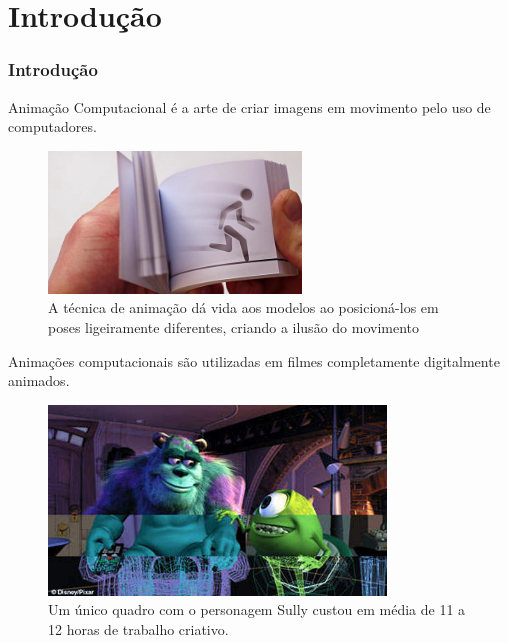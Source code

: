 \documentclass[brazil]{beamer}
\begin{document}
\section{Introdução}
\begin{frame}[fragile]
  \frametitle{Introdução}

  \begin{definition}
  Animação Computacional é a arte de criar imagens em movimento pelo uso de
computadores.
  \end{definition}
      \begin{figure}
        \centering
        \includegraphics[width = 0.6\textwidth, keepaspectratio]{./img/flipBook.jpg}
        \caption{A técnica de animação dá vida aos modelos ao posicioná-los em
          poses ligeiramente diferentes, criando a ilusão do movimento }

      \end{figure}


\end{frame}


\begin{frame}
  Animações computacionais são utilizadas em filmes completamente digitalmente
  animados.
      \begin{figure}
        \centering
        \includegraphics[width = 0.8\textwidth, keepaspectratio]{./img/sully.jpg}
        \caption{Um único quadro com o personagem Sully custou em média de 11 a 12 horas de trabalho criativo.}
      \end{figure}
\end{frame}
\end{document}
